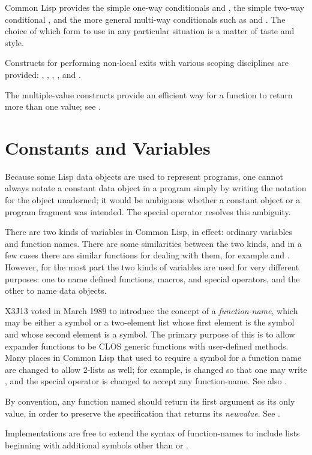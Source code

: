Common Lisp provides the simple one-way conditionals  and ,
the simple two-way conditional , and the more general multi-way
conditionals such as  and .  The choice of which form
to use in any particular situation is a matter of taste and
style.

Constructs for performing non-local exits with various scoping
disciplines are provided: , ,
,
, and .

The multiple-value constructs provide an efficient way for a function
to return more than one value; see .

\section{Constants and Variables}
\label{FUNCTION-NAME-SECTION}

Because some Lisp data objects are used to represent programs,
one cannot always notate a constant data object in a program simply
by writing the notation for the object unadorned; it would be ambiguous
whether a constant object or a program fragment was intended.
The  special operator resolves this ambiguity.

There are two kinds of variables in Common Lisp, in effect: ordinary
variables and function names.  There are some similarities between
the two kinds, and in a few cases there are similar functions for
dealing with them, for example  and .
However, for the most part the two kinds of variables are
used for very different purposes: one to name defined functions,
macros, and special operators, and the other to name data objects.

\begin{newer}
X3J13 voted in March 1989  to introduce the concept
of a \emph{function-name}, which may be either a symbol or a two-element list whose
first element is the symbol  and whose second element is a symbol.
The primary purpose of this is to allow  expander functions to be
CLOS generic functions with user-defined methods.
Many places in Common Lisp that used to require a symbol for a function
name are changed to allow 2-lists as well; for example, 
is changed so that one may write ,
and the  special operator is changed to accept any function-name.
See also .

By convention, any function named  should return its first
argument as its only value, in order to preserve the specification that
 returns its \emph{newvalue}.  See .

Implementations are free to extend the syntax of function-names to
include lists beginning with additional symbols other than 
or .
\end{newer}

